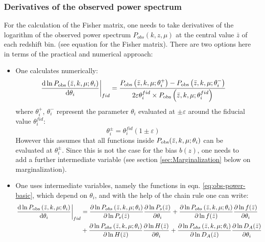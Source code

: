 \subsubsection{Derivatives of the observed power spectrum}

For the calculation of the Fisher matrix, one needs to take derivatives
of the logarithm of the observed power spectrum $P_{obs}(k,z,\mu)$
at the central value $\bar{z}$ of each redshift bin. (see equation
for the Fisher matrix). There are two options here in terms of the
practical and numerical approach: 
\begin{itemize}
\item One calculates numerically: 
\begin{equation}
\left.\frac{\mbox{d}\ln P_{{\rm obs}}\left(\bar{z},k,\mu;\theta_{i}\right)}{\mbox{d}\theta_{i}}\right|_{fid}=\frac{P_{{\rm obs}}\left(\bar{z},k,\mu;\theta_{i}^{+}\right)-P_{{\rm obs}}\left(\bar{z},k,\mu;\theta_{i}^{-}\right)}{2\varepsilon\theta_{i}^{fid}\times P_{{\rm obs}}\left(\bar{z},k,\mu;\theta_{i}^{fid}\right)}
\end{equation}
where $\theta_{i}^{+}$, $\theta_{i}^{-}$ represent the parameter
$\theta_{i}$ evaluated at $\pm\varepsilon$ around the fiducial value
$\theta_{i}^{fid}$:
\begin{equation}
\theta_{i}^{\pm}=\theta_{i}^{fid}(1\pm\varepsilon)
\end{equation}
However this assumes that all functions inside $P_{{\rm obs}}(\bar{z},k,\mu;\theta_{i})$
can be evaluated at $\theta_{i}^{\pm}$. Since this is not the case
for the bias $b(z)$, one needs to add a further intermediate variable
(see section \ref{sec:Marginalization} below on marginalization).
\item One uses intermediate variables, namely the functions in eqn. \ref{eq:obs-power-basic},
which depend on $\theta_{i}$, and with the help of the chain rule
one can write:
\begin{align}
\left.\frac{\mbox{d}\ln P_{{\rm obs}}\left(\bar{z},k,\mu;\theta_{i}\right)}{\mbox{d}\theta_{i}}\right|_{fid} & =\frac{\partial\ln P_{obs}\left(\bar{z},k,\mu;\theta_{i}\right)}{\partial\ln P_{s}(\bar{z})}\frac{\partial\ln P_{s}(\bar{z})}{\partial\theta_{i}}+\frac{\partial\ln P_{obs}\left(\bar{z},k,\mu;\theta_{i}\right)}{\partial\ln f(\bar{z})}\frac{\partial\ln f(\bar{z})}{\partial\theta_{i}}\nonumber \\
 & +\frac{\partial\ln P_{obs}\left(\bar{z},k,\mu;\theta_{i}\right)}{\partial\ln H(\bar{z})}\frac{\partial\ln H(\bar{z})}{\partial\theta_{i}}+\frac{\partial\ln P_{obs}\left(\bar{z},k,\mu;\theta_{i}\right)}{\partial\ln D_{A}(\bar{z})}\frac{\partial\ln D_{A}(\bar{z})}{\partial\theta_{i}}\nonumber \\

\end{align}
\end{itemize}
